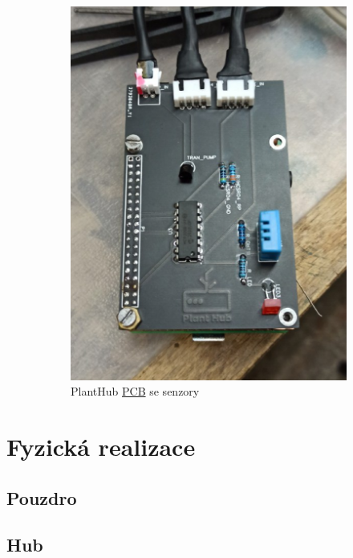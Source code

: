 \documentclass[12pt,a4paper]{article}
\begin{document}
\begin{figure}[h]
\begin{subfigure}[b]{0.4\linewidth}
		\includegraphics[width=\linewidth]{planthub.png}
		\caption{PlantHub \underline{\ac{PCB}} se senzory}
	\end{subfigure}
	\caption{}
\end{figure}

\clearpage

\section{Fyzická realizace}

\subsection{Pouzdro}

\subsection{Hub}
\end{document}
